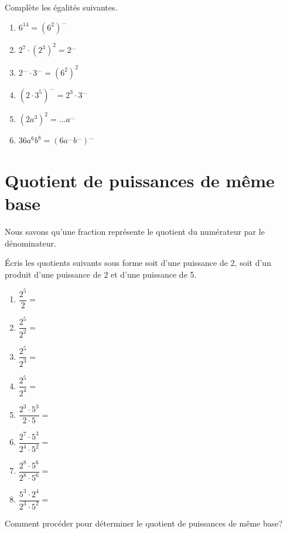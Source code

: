 \documentclass[../../syllabus_2.tex]{subfiles}
\begin{document}
\begin{exercise}
	Complète les égalités suivantes.
	\begin{enumerate} [cols=2, itemsep=2em]
		\item \(6^{14}=(6^2)^{\dots}\)
		\item \(2^7\cdot(2^3)^2=2^{\dots}\)
		\item \(2^{\dots}\cdot 3^{\dots}=(6^2)^2\)
		\item \(\left(2\cdot 3^5\right)^{\dots}=2^3\cdot 3^{\dots}\)
		\item \(\left(2a^3\right)^2=\dots a^{\dots}\)
		\item \(36a^6b^8=\left(6a^{\dots}b^{\dots}\right)^{\dots}\)
	\end{enumerate}
\end{exercise}

\pagebreak

\section{Quotient de puissances de même base}
Nous savons qu'une fraction représente le quotient du numérateur par le dénominateur.

Écris les quotients suivants sous forme soit d'une puissance de 2, soit d'un produit d'une puissance de 2 et d'une puissance de 5.

\begin{enumerate}[cols=2,itemsep=4em]
	\item \(\dfrac{2^5}{2}=\)
	\item \(\dfrac{2^5}{2^2}=\)
	\item \(\dfrac{2^5}{2^3}=\)
	\item \(\dfrac{2^5}{2^4}=\)
	\item \(\dfrac{2^3\cdot 5^3}{2\cdot 5}=\)
	\item \(\dfrac{2^7\cdot 5^3}{2^4\cdot 5^2}=\)
	\item \(\dfrac{2^8\cdot 5^6}{2^8\cdot 5^6}=\)
	\item \(\dfrac{5^3\cdot 2^4}{2^3\cdot 5^2}=\)
\end{enumerate}
\vspace*{3em}

Comment procéder pour déterminer le quotient de puissances de même base?


\begin{center}
\end{center}
\end{document}
